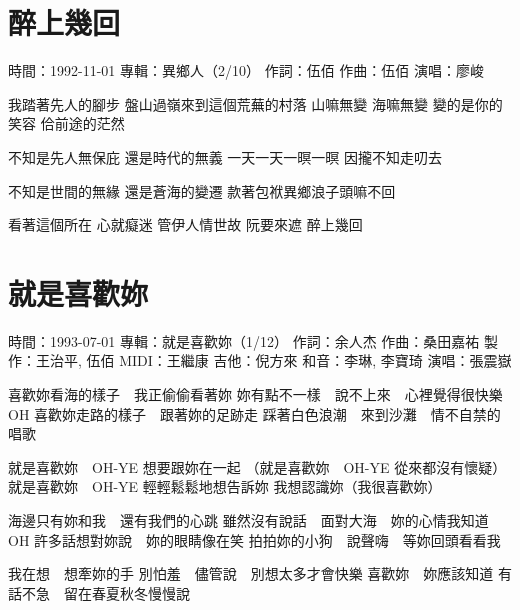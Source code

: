 \documentclass[UTF8,a4paper,oneside,twocolumn,12pt]{ctexbook}
\newcommand{\infopair}[2]{\textbullet #1：#2}
\newcommand{\zc}[1][伍佰]{\infopair{作詞}{#1}}
\newcommand{\zq}[1][伍佰]{\infopair{作曲}{#1}}
\newcommand{\zj}[1]{\infopair{專輯}{#1}}
\newcommand{\zz}[1]{\infopair{製作}{#1}}
\newcommand{\sj}[1]{\infopair{時間}{#1}}
\newenvironment{info}{\begin{flushleft}\kaishu
	}
	{\end{flushleft}\normalsize\yahei\par}
\newenvironment{lyric}{
	}
{}
\begin{document}
\section{醉上幾回}
\begin{info}
	\sj{1992-11-01}
	\zj{異鄉人（2/10）}
	\zc
	\zq
	\infopair{演唱}{廖峻}
\end{info}
\begin{lyric}
	我踏著先人的腳步
	盤山過嶺來到這個荒蕪的村落
	山嘛無變
	海嘛無變
	變的是你的笑容
	佮前途的茫然

	不知是先人無保庇
	還是時代的無義
	一天一天一暝一暝
	因攏不知走叨去

	不知是世間的無緣
	還是蒼海的變遷
	款著包袱異鄉浪子頭嘛不回

	看著這個所在
	心就癡迷
	管伊人情世故
	阮要來遮
	醉上幾回
\end{lyric}

\section{就是喜歡妳}
\begin{info}
	\sj{1993-07-01}
	\zj{就是喜歡妳（1/12）}
	\zc[余人杰]
	\zq[桑田嘉祐]
	\zz{王治平, 伍佰}
	\infopair{MIDI}{王繼康}
	\infopair{吉他}{倪方來}
	\infopair{和音}{李琳, 李寶琦}
	\infopair{演唱}{張震嶽}
\end{info}
\begin{lyric}
	喜歡妳看海的樣子　我正偷偷看著妳
	妳有點不一樣　說不上來　心裡覺得很快樂 OH
	喜歡妳走路的樣子　跟著妳的足跡走
	踩著白色浪潮　來到沙灘　情不自禁的唱歌

	就是喜歡妳　OH-YE 想要跟妳在一起
	（就是喜歡妳　OH-YE 從來都沒有懷疑）
	就是喜歡妳　OH-YE 輕輕鬆鬆地想告訴妳
	我想認識妳（我很喜歡妳）

	海邊只有妳和我　還有我們的心跳
	雖然沒有說話　面對大海　妳的心情我知道　OH
	許多話想對妳說　妳的眼睛像在笑
	拍拍妳的小狗　說聲嗨　等妳回頭看看我

	我在想　想牽妳的手
	別怕羞　儘管說　別想太多才會快樂
	喜歡妳　妳應該知道
	有話不急　留在春夏秋冬慢慢說
\end{lyric}
\end{document}
